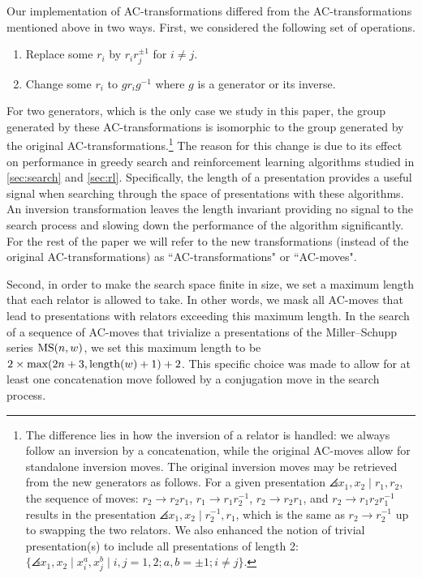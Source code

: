 Our implementation of AC-transformations differed from the AC-transformations mentioned above in two ways.
First, we considered the following set of operations.
\begin{enumerate}[label=(AC$'$\arabic*)]
	\item Replace some $r_i$ by $r_i r_j^{\pm 1}$ for $i \neq j$.
	\item Change some $r_i$ to $g r_i g^{-1}$ where $g$ is a generator or its inverse.
\end{enumerate}
For two generators, which is the only case we study in this paper, the group generated by these AC-transformations is isomorphic to the group generated by the original AC-transformations.\footnote{
The difference lies in how the inversion of a relator is handled: we always follow an inversion by a concatenation, while the original AC-moves allow for standalone inversion moves.
The original inversion moves may be retrieved from the new generators as follows.
For a given presentation $\angles{x_1, x_2 \mid r_1, r_2}$, the sequence of moves: $r_2 \to r_2 r_1$, $r_1 \to r_1 r_2^{-1}$, $r_2 \to r_2 r_1$, and $r_2 \to r_1 r_2 r_1^{-1}$ results in the presentation $\angles{x_1, x_2 \mid r_2^{-1}, r_1}$, which is the same as $r_2 \to r_2^{-1}$ up to swapping the two relators.
We also enhanced the notion of trivial presentation(s) to include all presentations of length 2: $\{\angles{x_1, x_2 \mid x_i^{a}, x_j^{b}} \mid i, j = 1, 2; a, b = \pm 1; i \neq j \}$.
}
The reason for this change is due to its effect on performance in greedy search and reinforcement learning algorithms studied in \autoref{sec:search} and \autoref{sec:rl}.
Specifically, the length of a presentation provides a useful signal when searching through the space of presentations with these algorithms.
An inversion transformation leaves the length invariant providing no signal to the search process and slowing down the performance of the algorithm significantly.
For the rest of the paper we will refer to the new transformations (instead of the original AC-transformations) as ``AC-transformations" or ``AC-moves".

Second, in order to make the search space finite in size, we set a maximum length that each relator is allowed to take. In other words, we mask all AC-moves that lead to presentations with relators exceeding this maximum length.
In the search of a sequence of AC-moves that trivialize a presentations of the Miller--Schupp series $\text{MS}(n, w)$, we set this maximum length to be $2 \times \text{max}(2 n+3, \operatorname{length}(w)+1) + 2$.
This specific choice was made to allow for at least one concatenation move followed by a conjugation move in the search process.
